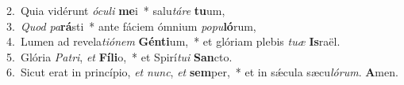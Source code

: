 {2.~}Quia vidérunt \textit{ó}\textit{cu}\textit{li} \textbf{me}i~* salu\textit{tá}\textit{re} \textbf{tu}um,\\
{3.~}\textit{Quod} \textit{pa}\textbf{rá}sti~* ante fáciem ómnium \textit{po}\textit{pu}\textbf{ló}rum,\\
{4.~}Lumen ad revela\textit{ti}\textit{ó}\textit{nem} \textbf{Gén}\textbf{ti}um,~* et glóriam plebis \textit{tu}\textit{æ} \textbf{Is}raël.\\
{5.~}Glória \textit{Pa}\textit{tri}, \textit{et} \textbf{Fí}\textbf{li}o,~* et Spirí\textit{tu}\textit{i} \textbf{San}cto.\\
{6.~}Sicut erat in princípio, \textit{et} \textit{nunc}, \textit{et} \textbf{sem}per,~* et in sǽcula sæcu\textit{ló}\textit{rum}. \textbf{A}men.\\
